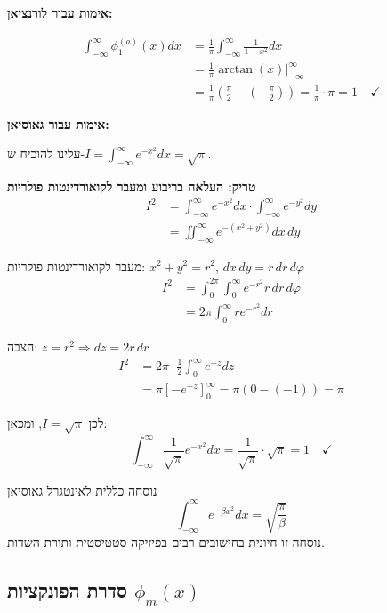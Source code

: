 \documentclass{article}
\begin{document}
\begin{solutionbox}
\textbf{אימות עבור לורנציאן:}

\begin{align*}
\int_{-\infty}^{\infty}\phi_1^{(a)}(x)dx &= \frac{1}{\pi}\int_{-\infty}^{\infty}\frac{1}{1+x^2}dx \\
&= \frac{1}{\pi}\arctan(x)\bigg|_{-\infty}^{\infty} \\
&= \frac{1}{\pi}\left(\frac{\pi}{2} - \left(-\frac{\pi}{2}\right)\right) = \frac{1}{\pi}\cdot\pi = 1 \quad \checkmark
\end{align*}

\textbf{אימות עבור גאוסיאן:}

עלינו להוכיח ש-$\displaystyle I = \int_{-\infty}^{\infty}e^{-x^2}dx = \sqrt{\pi}$.

\textbf{טריק: העלאה בריבוע ומעבר לקואורדינטות פולריות}
\begin{align*}
I^2 &= \int_{-\infty}^{\infty}e^{-x^2}dx \cdot \int_{-\infty}^{\infty}e^{-y^2}dy \\
&= \iint_{-\infty}^{\infty}e^{-(x^2+y^2)}dx\,dy
\end{align*}

מעבר לקואורדינטות פולריות: $x^2 + y^2 = r^2$, $dx\,dy = r\,dr\,d\varphi$
\begin{align*}
I^2 &= \int_0^{2\pi}\int_0^{\infty}e^{-r^2} r\,dr\,d\varphi \\
&= 2\pi\int_0^{\infty}re^{-r^2}dr
\end{align*}

הצבה: $z = r^2 \Rightarrow dz = 2r\,dr$
\begin{align*}
I^2 &= 2\pi \cdot \frac{1}{2}\int_0^{\infty}e^{-z}dz \\
&= \pi\left[-e^{-z}\right]_0^{\infty} = \pi(0-(-1)) = \pi
\end{align*}

לכן $I = \sqrt{\pi}$, ומכאן:
\[
\int_{-\infty}^{\infty}\frac{1}{\sqrt{\pi}}e^{-x^2}dx = \frac{1}{\sqrt{\pi}} \cdot \sqrt{\pi} = 1 \quad \checkmark
\]
\end{solutionbox}

\begin{importantbox}{נוסחה כללית לאינטגרל גאוסיאן}
\[
\boxed{\int_{-\infty}^{\infty}e^{-\beta x^2}dx = \sqrt{\frac{\pi}{\beta}}}
\]
נוסחה זו חיונית בחישובים רבים בפיזיקה סטטיסטית ותורת השדות.
\end{importantbox}

\subsection{סדרת הפונקציות $\phi_m(x)$}
\end{document}
